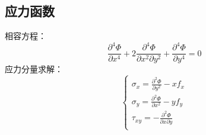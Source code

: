 \subsection{应力函数}
相容方程：
\begin{equation}
	\frac{\partial ^4\varPhi}{\partial x^4}+2\frac{\partial ^4\varPhi}{\partial x^2\partial y^2}+\frac{\partial ^4\varPhi}{\partial y^4}=0
\end{equation}
\hspace*{2em}应力分量求解：
\begin{equation}
	\begin{cases}
	\sigma _x=\frac{\partial ^2\varPhi}{\partial y^2}-xf_x\\
	\sigma _y=\frac{\partial ^2\varPhi}{\partial x^2}-yf_y\\
	\tau _{xy}=-\frac{\partial ^2\varPhi}{\partial x\partial y}\\
	\end{cases}
\end{equation}
